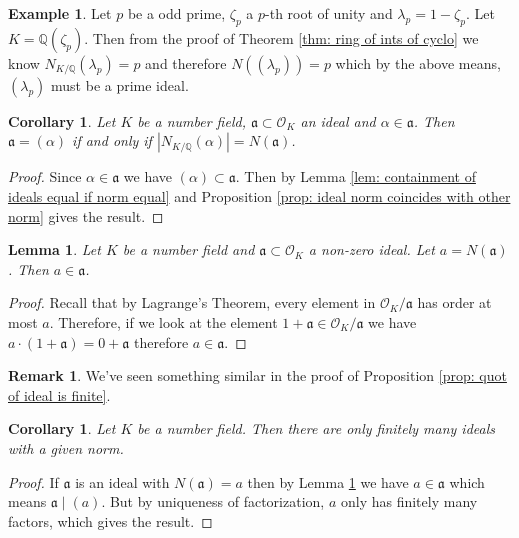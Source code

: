 \documentclass[11pt,a4paper]{report}
\theoremstyle{plain}
\newtheorem{lemma}[subsection]{Lemma}
\newtheorem{corollary}[subsection]{Corollary}
\theoremstyle{definition}
\newtheorem{exmp}[subsection]{Example}
\theoremstyle{definition}
\newtheorem{rmrk}[subsection]{Remark}
\def\QQ{\mathbb{Q}}
\def \a{\alpha}
\def \lam {\lambda}
\def \OO {\mathcal{O}}
\def\gotha{\mathfrak{a}}
\begin{document}
	\begin{exmp}
		Let $p$ be a odd prime, $\zeta_p$ a $p$-th root of unity and $\lam_p=1-\zeta_p$. Let $K=\QQ(\zeta_p)$. Then  from the proof of Theorem \ref{thm: ring of ints of cyclo} we know $N_{K/\QQ}(\lam_p)=p$ and therefore  $N((\lam_p))=p$ which by the above means, $(\lam_p)$ must be a prime ideal.
	\end{exmp}
	
	\begin{corollary}
		Let $K$ be a number field, $\gotha \subset \OO_K$ an ideal and $\a \in \gotha$. Then $\gotha=(\a)$ if and only if $|N_{K/\QQ}(\a)|=N(\gotha)$.
	\end{corollary}
	
	\begin{proof}
		Since $\a \in \gotha$ we have $(\a) \subset \gotha$. Then by Lemma \ref{lem: containment of ideals equal if norm equal} and Proposition \ref{prop: ideal norm coincides with other norm} gives the result.
	\end{proof}
	
	\begin{lemma}\label{lem: ideal contains its norm}
		Let $K$ be a number field and $\gotha \subset \OO_K$ a non-zero ideal. Let $a=N(\gotha)$. Then $a \in \gotha$.
	\end{lemma}
	\begin{proof}
		Recall that by Lagrange's Theorem, every element in $\OO_K/\gotha$ has order at most $a$. Therefore, if we look at the element $1+\gotha \in \OO_K/\gotha$ we have $a\cdot (1+\gotha)=0 +\gotha$ therefore $a \in \gotha$. 
	\end{proof}
	
	\begin{rmrk}
		We've seen something similar in the proof of Proposition \ref{prop: quot of ideal is finite}.
	\end{rmrk}
	
	
	\begin{corollary}\label{cor: fin many ideals of given norm}
		Let $K$ be a number field. Then there are only finitely many ideals with a given norm.
	\end{corollary}
	\begin{proof}
		If $\gotha$ is an ideal with $N(\gotha)=a$ then by Lemma \ref{lem: ideal contains its norm} we have $a \in \gotha$ which means $\gotha \mid (a)$. But by uniqueness of factorization, $a$ only has finitely many factors, which gives the result.
	\end{proof}
	
\end{document}
